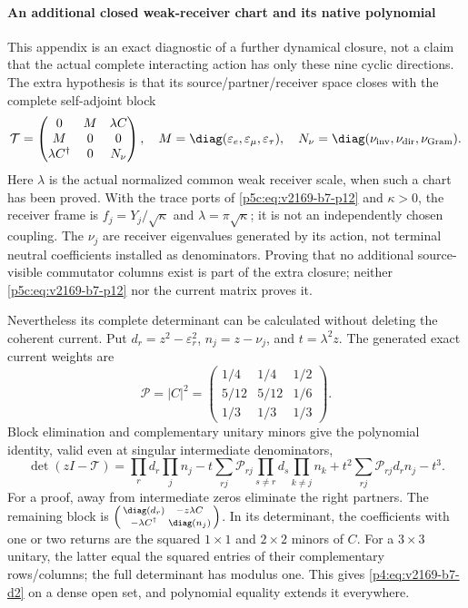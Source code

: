 \documentclass[12pt,a4paper]{article}
\begin{document}
\paragraph{An additional closed weak-receiver chart and its native polynomial}
\label{p4:v2169:b7:app:weakchart}
This appendix is an exact diagnostic of a further dynamical closure, not a
claim that the actual complete interacting action has only these nine
cyclic directions. The extra hypothesis is that its source/partner/receiver
space closes with the complete self-adjoint block
\begin{equation}
 \mathcal T=\begin{pmatrix}
 0&M&\lambda C\\ M&0&0\\ \lambda C^\dagger&0&N_\nu
 \end{pmatrix},\quad
 M=\diag(\varepsilon_e,\varepsilon_\mu,\varepsilon_\tau),\quad
 N_\nu=\diag(\nu_{\rm inv},\nu_{\rm dir},\nu_{\rm Gram}).
 \label{p4:eq:v2169-b7-d1}
\end{equation}
Here $\lambda$ is the actual normalized common weak receiver scale, when
such a chart has been proved. With the trace ports of \eqref{p5c:eq:v2169-b7-p12} and $\kappa>0$,
the receiver frame is $f_j=Y_j/\sqrt\kappa$ and
$\lambda=\pi\sqrt\kappa$; it is not an independently chosen coupling.
The $\nu_j$ are receiver eigenvalues generated
by its action, not terminal neutral coefficients installed as denominators.
Proving that no additional source-visible commutator columns exist is part
of the extra closure; neither \eqref{p5c:eq:v2169-b7-p12} nor the current matrix proves it.

Nevertheless its complete determinant can be calculated without deleting
the coherent current. Put $d_r=z^2-\varepsilon_r^2$, $n_j=z-\nu_j$, and
$t=\lambda^2z$. The generated exact current weights are
\[
 \mathcal P=|C|^2=\begin{pmatrix}
 1/4&1/4&1/2\\5/12&5/12&1/6\\1/3&1/3&1/3
 \end{pmatrix}.
\]
Block elimination and complementary unitary minors give the polynomial
identity, valid even at singular intermediate denominators,
\begin{equation}
 \boxed{\det(zI-\mathcal T)
 =\prod_rd_r\prod_jn_j
 -t\sum_{rj}\mathcal P_{rj}\prod_{s\ne r}d_s\prod_{k\ne j}n_k
 +t^2\sum_{rj}\mathcal P_{rj}d_rn_j-t^3.}
 \label{p4:eq:v2169-b7-d2}
\end{equation}
For a proof, away from intermediate zeros eliminate the right partners.
The remaining block is $\left(\begin{smallmatrix}\diag(d_r)&-z\lambda C\\
-\lambda C^\dagger&\diag(n_j)\end{smallmatrix}\right)$.
In its determinant, the coefficients with one or two returns are the
squared $1\times1$ and $2\times2$ minors of $C$. For a $3\times3$ unitary,
the latter equal the squared entries of their complementary rows/columns;
the full determinant has modulus one. This gives \eqref{p4:eq:v2169-b7-d2} on a dense open set,
and polynomial equality extends it everywhere.
\end{document}
